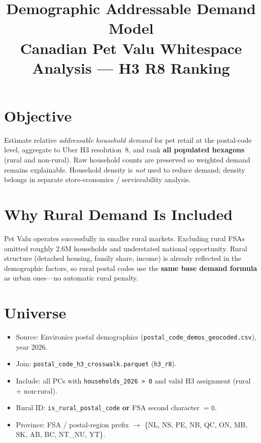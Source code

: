 \documentclass[10pt]{article}
\title{\vspace{-1.5em}Demographic Addressable Demand Model\\[0.25em]
\large Canadian Pet Valu Whitespace Analysis --- H3 R8 Ranking}
\author{}
\date{}
\begin{document}
\maketitle
\vspace{-1.5em}

\section{Objective}
Estimate relative \emph{addressable household demand} for pet retail at the postal-code level, aggregate to Uber H3 resolution~8, and rank \textbf{all populated hexagons} (rural and non-rural). Raw household counts are preserved so weighted demand remains explainable. Household density is \emph{not} used to reduce demand; density belongs in separate store-economics / serviceability analysis.

\section{Why Rural Demand Is Included}
Pet Valu operates successfully in smaller rural markets. Excluding rural FSAs omitted roughly 2.6M households and understated national opportunity. Rural structure (detached housing, family share, income) is already reflected in the demographic factors, so rural postal codes use the \textbf{same base demand formula} as urban ones---no automatic rural penalty.

\section{Universe}
\begin{itemize}
  \item Source: Environics postal demographics (\texttt{postal\_code\_demos\_geocoded.csv}), year 2026.
  \item Join: \texttt{postal\_code\_h3\_crosswalk.parquet} (\texttt{h3\_r8}).
  \item Include: all PCs with \texttt{households\_2026 > 0} and valid H3 assignment (rural + non-rural).
  \item Rural ID: \texttt{is\_rural\_postal\_code} \textbf{or} FSA second character $=\mathtt{0}$.
  \item Province: FSA / postal-region prefix $\to$ \{NL, NS, PE, NB, QC, ON, MB, SK, AB, BC, NT\_NU, YT\}.
\end{itemize}
\end{document}
